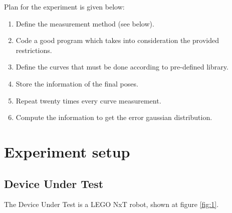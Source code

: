 \documentclass[10pt]{scrartcl}
\begin{document}
Plan for the experiment is given below:

\begin{enumerate}
	\item Define the measurement method (see below).
	\item Code a good program which takes into consideration the provided restrictions.
	\item Define the curves that must be done according to pre-defined library.
	\item Store the information of the final poses.
	\item Repeat twenty times every curve measurement.
	\item Compute the information to get the error gaussian distribution.
\end{enumerate}

\section*{Experiment setup}

\subsection*{Device Under Test}

The Device Under Test is a LEGO NxT robot, shown at figure \ref{fig:1}.
\end{document}
